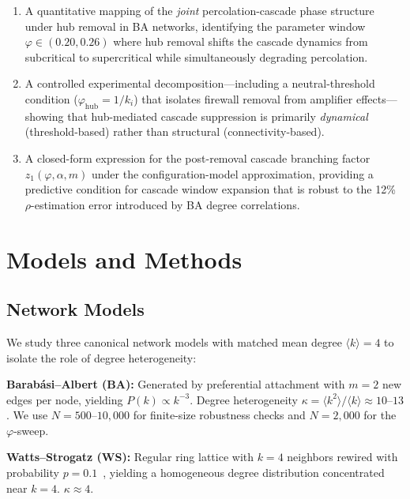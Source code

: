 \documentclass[aps,pre,twocolumn,superscriptaddress,showpacs]{revtex4-2}
\newcommand{\avg}[1]{\langle #1 \rangle}
\begin{document}
\begin{enumerate}
\item A quantitative mapping of the \emph{joint} percolation-cascade phase structure under hub removal in BA networks, identifying the parameter window $\varphi \in (0.20, 0.26)$ where hub removal shifts the cascade dynamics from subcritical to supercritical while simultaneously degrading percolation.

\item A controlled experimental decomposition---including a neutral-threshold condition ($\varphi_{\mathrm{hub}} = 1/k_i$) that isolates firewall removal from amplifier effects---showing that hub-mediated cascade suppression is primarily \emph{dynamical} (threshold-based) rather than structural (connectivity-based).

\item A closed-form expression for the post-removal cascade branching factor $z_1(\varphi, \alpha, m)$ under the configuration-model approximation, providing a predictive condition for cascade window expansion that is robust to the 12\% $\rho$-estimation error introduced by BA degree correlations.
\end{enumerate}

\section{Models and Methods}
\label{sec:methods}

\subsection{Network Models}

We study three canonical network models with matched mean degree $\avg{k} = 4$ to isolate the role of degree heterogeneity:

\textbf{Barab\'asi--Albert (BA):} Generated by preferential attachment with $m=2$ new edges per node, yielding $P(k) \propto k^{-3}$. Degree heterogeneity $\kappa = \avg{k^2}/\avg{k} \approx 10$--$13$. We use $N=500$--$10{,}000$ for finite-size robustness checks and $N=2{,}000$ for the $\varphi$-sweep.

\textbf{Watts--Strogatz (WS):} Regular ring lattice with $k=4$ neighbors rewired with probability $p=0.1$~\cite{WattsStrogatz1998}, yielding a homogeneous degree distribution concentrated near $k=4$. $\kappa \approx 4$.
\end{document}
